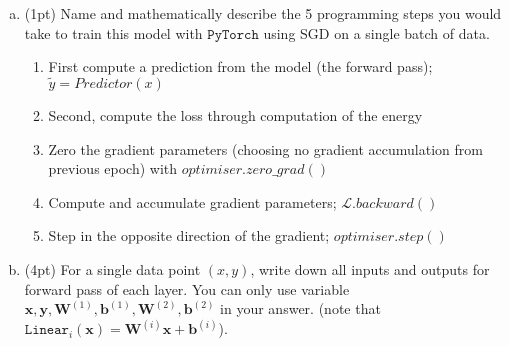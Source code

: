 \documentclass{article}
\newcommand{\cL}{\mathcal{L}}
\begin{document}
\begin{enumerate}[(a)]
\item
(1pt) Name and mathematically describe the 5 programming steps you would take to train this model with $\texttt{PyTorch}$ using SGD on a single batch of data.
\begin{tcolorbox}
    \begin{enumerate}
      \item First compute a prediction from the model (the forward pass);
            $\tilde{y}=Predictor(x)$
      \item Second, compute the loss through computation of the energy
      \item Zero the gradient parameters (choosing no gradient accumulation from previous epoch) with $optimiser.zero\_grad()$
      \item Compute and accumulate gradient parameters; $\cL.backward()$
      \item Step in the opposite direction of the gradient;
            $optimiser.step()$
    \end{enumerate}
  \end{tcolorbox}
\item
(4pt) For a single data point $(x, y)$, write down all inputs and outputs for forward pass of each layer. You can only use variable $ \bm{x}, \bm{y}, \bm{W}^{(1)}, \bm{b}^{(1)}, \bm{W}^{(2)}, \bm{b}^{(2)}$ in your answer. (note that $\texttt{Linear}_i (\bm{x}) = \bm{W}^{(i)}\bm{x} + \bm{b}^{(i)}$).
\begin{tcolorbox}
    

\end{tcolorbox}
\end{enumerate}
\end{document}
